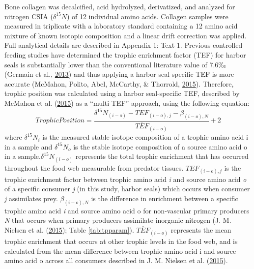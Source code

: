 \documentclass [11pt, proquest] {uwthesis}[2015/03/03]
\begin{document}
Bone collagen was decalcified, acid hydrolyzed, derivatized, and
analyzed for nitrogen CSIA (\(\delta^{15}N\)) of 12 individual amino
acids. Collagen samples were measured in triplicate with a laboratory
standard containing a 12 amino acid mixture of known isotopic
composition and a linear drift correction was applied. Full analytical
details are described in Appendix 1: Text 1. Previous controlled feeding
studies have determined the trophic enrichment factor (TEF) for harbor
seals is substantially lower than the conventional literature value of
7.6‰ (Germain et al., \protect\hyperlink{ref-Germain2013}{2013}) and
thus applying a harbor seal-specific TEF is more accurate (McMahon,
Polito, Abel, McCarthy, \& Thorrold,
\protect\hyperlink{ref-McMahon2015}{2015}). Therefore, trophic position
was calculated using a harbor seal-specific TEF, described by McMahon et
al. (\protect\hyperlink{ref-McMahon2015}{2015}) as a ``multi-TEF''
approach, using the following equation:
\begin{equation} 
Trophic Position =   
  \frac{\delta^{15}N_{(i-o)} - TEF_{(i-o),j} - \beta_{(i-o),N}}{\overline{TEF}_{(i-o)}}+2
  \label{eq:TP3}
\end{equation}
where \(\delta^{15}N_i\) is the measured stable isotope composition of a
trophic amino acid i in a sample and \(\delta^{15}N_o\) is the stable
isotope composition of a source amino acid o in a
sample.\(\delta^{15}N_{(i-o)}\) represents the total trophic enrichment
that has occurred throughout the food web measurable from predator
tissues. \(TEF_{(i-o),j}\) is the trophic enrichment factor between
trophic amino acid \emph{i} and source amino acid \emph{o} of a specific
consumer \emph{j} (in this study, harbor seals) which occurs when
consumer \emph{j} assimilates prey. \(\beta_{(i-o),N}\) is the
difference in enrichment between a specific trophic amino acid \emph{i}
and source amino acid o for non-vascular primary producers \emph{N} that
occurs when primary producers assimilate inorganic nitrogen (J. M.
Nielsen et al. (\protect\hyperlink{ref-Nielsen2015}{2015}); Table
\ref{tab:tpparam}). \(\overline{TEF}_{(i-o)}\) represents the mean
trophic enrichment that occurs at other trophic levels in the food web,
and is calculated from the mean difference between trophic amino acid i
and source amino acid o across all consumers described in J. M. Nielsen
et al. (\protect\hyperlink{ref-Nielsen2015}{2015}).
\end{document}
